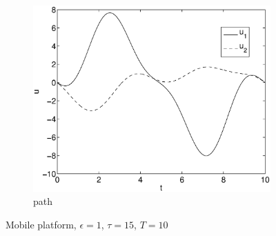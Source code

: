 \begin{figure}[h]
\begin{subfigure}[b]{\textwidth}
\centering
\includegraphics[height=0.3\textheight]{img/final_15_1_10_u.eps}
\caption{path}
\end{subfigure}
\caption{Mobile platform, $\epsilon=1$, $\tau=15$, $T=10$}
\label{fig:pl1}
\end{figure}

